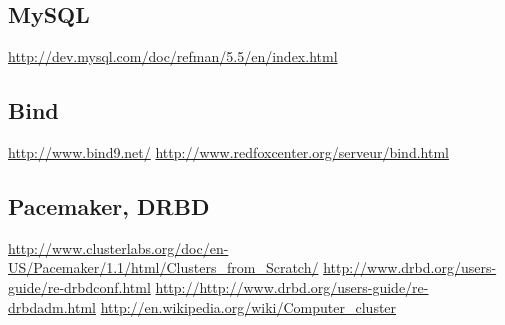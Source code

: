 \documentclass[11pt,a4paper]{report}
\begin{document}
            \subsection{MySQL}
                
                \url{http://dev.mysql.com/doc/refman/5.5/en/index.html}
                \url{}
                
            \subsection{Bind}
                
                \url{http://www.bind9.net/}
                \url{http://www.redfoxcenter.org/serveur/bind.html}
                
            \subsection{Pacemaker, DRBD}
                
                \url{http://www.clusterlabs.org/doc/en-US/Pacemaker/1.1/html/Clusters_from_Scratch/}
                \url{http://www.drbd.org/users-guide/re-drbdconf.html}
                \url{http://http://www.drbd.org/users-guide/re-drbdadm.html}
                \url{http://en.wikipedia.org/wiki/Computer_cluster}
                
\end{document}
